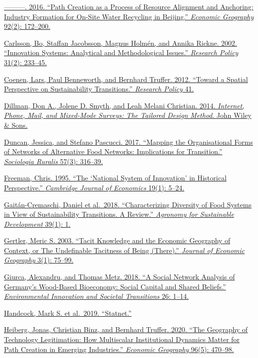 \documentclass[twoside,12pt,final]{ucthesis-CA2012}
\begin{document}
\begin{ucmainmatter}
\href{https://www.zotero.org/google-docs/?hv36Bh}{---------. 2016. ``Path Creation as a Process of Resource Alignment and
Anchoring: Industry Formation for On-Site Water Recycling in Beijing.''
\emph{Economic Geography} 92(2):
172--200.}

\href{https://www.zotero.org/google-docs/?hv36Bh}{Carlsson, Bo, Staffan Jacobsson, Magnus Holmén, and Annika Rickne.
2002. ``Innovation Systems: Analytical and Methodological Issues.''
\emph{Research Policy} 31(2):
233--45.}

\href{https://www.zotero.org/google-docs/?hv36Bh}{Coenen, Lars, Paul Benneworth, and Bernhard Truffer. 2012. ``Toward a
Spatial Perspective on Sustainability Transitions.'' \emph{Research Policy}
41.}

\href{https://www.zotero.org/google-docs/?hv36Bh}{Dillman, Don A., Jolene D. Smyth, and Leah Melani Christian. 2014.
\emph{Internet, Phone, Mail, and Mixed-Mode Surveys: The Tailored Design
Method}. John Wiley \& Sons.}

\href{https://www.zotero.org/google-docs/?hv36Bh}{Duncan, Jessica, and Stefano Pascucci. 2017. ``Mapping the
Organisational Forms of Networks of Alternative Food Networks:
Implications for Transition.'' \emph{Sociologia Ruralis} 57(3):
316--39.}

\href{https://www.zotero.org/google-docs/?hv36Bh}{Freeman, Chris. 1995. ``The `National System of Innovation' in
Historical Perspective.'' \emph{Cambridge Journal of Economics} 19(1):
5--24.}

\href{https://www.zotero.org/google-docs/?hv36Bh}{Gaitán-Cremaschi, Daniel et al.~2018. ``Characterizing Diversity of Food
Systems in View of Sustainability Transitions. A Review.'' \emph{Agronomy for
Sustainable Development} 39(1):
1.}

\href{https://www.zotero.org/google-docs/?hv36Bh}{Gertler, Meric S. 2003. ``Tacit Knowledge and the Economic Geography of
Context, or The Undefinable Tacitness of Being (There).'' \emph{Journal of
Economic Geography} 3(1):
75--99.}

\href{https://www.zotero.org/google-docs/?hv36Bh}{Giurca, Alexandru, and Thomas Metz. 2018. ``A Social Network Analysis of
Germany's Wood-Based Bioeconomy: Social Capital and Shared Beliefs.''
\emph{Environmental Innovation and Societal Transitions} 26:
1--14.}

\href{https://www.zotero.org/google-docs/?hv36Bh}{Handcock, Mark S. et al.~2019.
``Statnet.''}

\href{https://www.zotero.org/google-docs/?hv36Bh}{Heiberg, Jonas, Christian Binz, and Bernhard Truffer. 2020. ``The
Geography of Technology Legitimation: How Multiscalar Institutional
Dynamics Matter for Path Creation in Emerging Industries.'' \emph{Economic
Geography} 96(5): 470--98.}


\end{ucmainmatter}
\end{document}
